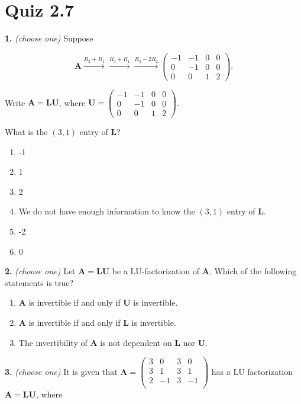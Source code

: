 \documentclass[10pt,a4paper]{article}
\begin{document}
\section{Quiz 2.7}
\textbf{1.} \textit{(choose one)} Suppose

\[\mathbf{A}\xrightarrow{R_2+R_1}\xrightarrow{R_3+R_1}\xrightarrow{R_3-2R_2}\begin{pmatrix}     -1  &  -1  &   0  &   0\\      0  &  -1  &   0  &   0\\      0  &   0  &   1  &   2 \end{pmatrix}.\]

Write \(\mathbf{A=LU}\), where \(\mathbf{U}=\begin{pmatrix}     -1  &  -1  &   0  &   0\\      0  &  -1  &   0  &   0\\      0  &   0  &   1  &   2 \end{pmatrix}\).

What is the \((3,1)\) entry of \(\mathbf{L}\)?

\begin{enumerate}[label=(\Alph*)]
\item -1
\item 1
\item 2
\item We do not have enough information to know the \((3,1)\) entry of \(\mathbf{L}\).
\item -2
\item 0
\end{enumerate}
\smallskip
\textbf{2.} \textit{(choose one)} Let \(\mathbf{A=LU}\) be a LU-factorization of \(\mathbf{A}\). Which of the following statements is true?

\begin{enumerate}[label=(\Alph*)]
\item \(\mathbf{A}\) is invertible if and only if \(\mathbf{U}\) is invertible.
\item \(\mathbf{A}\) is invertible if and only if \(\mathbf{L}\) is invertible.
\item The invertibility of \(\mathbf{A}\) is not dependent on \(\mathbf{L}\) nor \(\mathbf{U}\).
\end{enumerate}
\smallskip
\textbf{3.} \textit{(choose one)} It is given that \(\mathbf{A}=\begin{pmatrix}      3   &  0   &  3   &  0\\      3   &  1   &  3   &  1\\      2   & -1  &   3  &  -1\\ \end{pmatrix}\) has a LU factorization \(\mathbf{A=LU}\), where
\end{document}
